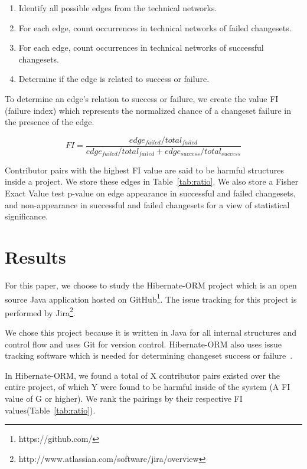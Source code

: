 \documentclass[conference]{IEEEtran}
\begin{document}
\begin{enumerate}
\item Identify all possible edges from the technical networks.
\item For each edge, count occurrences in technical networks of failed changesets.
\item For each edge, count occurrences in technical networks of successful changesets.
\item Determine if the edge is related to success or failure.
\end{enumerate}

To determine an edge's relation to success or failure, we create the value FI (failure
index) which represents the normalized chance of a changeset failure in the presence
of the edge. 

\begin{equation}
FI = \frac{edge_{failed} / total_{failed}}{edge_{failed} / total_{failed} + edge_{success} / total_{success}}
\end{equation}

Contributor pairs with the highest FI value are said to be harmful structures
inside a project. We store these edges in Table~\ref{tab:ratio}. We also store
a Fisher Exact Value test p-value on edge appearance in successful and failed
changesets, and non-appearance in successful and failed changesets for a view
of statistical significance.


\section{Results}
For this paper, we choose to study the Hibernate-ORM project which is an open source Java 
application hosted on GitHub\footnote{https://github.com/}. The issue tracking for this 
project is performed by Jira\footnote{http://www.atlassian.com/software/jira/overview}.

We chose this project because it is written in Java for all internal structures and control flow
and uses Git for version control. Hibernate-ORM also uses issue tracking software which 
is needed for determining changeset success or failure~\cite{Sliwerski:2005:CIF}.

In Hibernate-ORM, we found a total of X contributor pairs existed over the entire project, 
of which Y were found to be harmful inside of the system (A FI value of G or higher). 
We rank the pairings by their respective FI values(Table~\ref{tab:ratio}).
\end{document}
